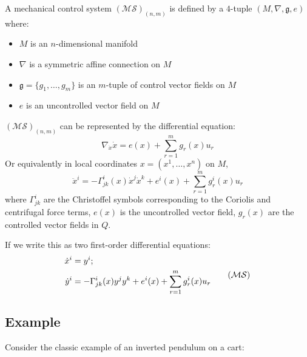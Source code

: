 \begin{defn}
    A mechanical control system $(\mathcal{MS})_{(n,m)}$ is defined by a $4$-tuple $(M, \nabla, \mathfrak{g}, e)$ where:
    \begin{itemize}
        \item $M$ is an $n$-dimensional manifold
        \item $\nabla$ is a symmetric affine connection on $M$
        \item $\mathfrak{g} = \{g_1, \dots, g_m\}$ is an $m$-tuple of control vector fields on $M$
        \item $e$ is an uncontrolled vector field on $M$
    \end{itemize}
    $(\mathcal{MS})_{(n,m)}$ can be represented by the differential equation:
    \begin{equation}
        \nabla_{\dot{x}} \dot{x} = e(x) + \sum_{r=1}^m g_r(x) u_r 
    \end{equation}
    Or equivalently in local coordinates $x = (x^1, \dots, x^n)$ on $M$, 
    \begin{equation}\label{SODE-initial}
        \ddot{x}^i = - \Gamma ^i_{jk}(x)\dot{x}^j \dot{x}^k + e^i(x) + \sum_{r=1}^m g^i_r(x)u_r
    \end{equation}
    where $\Gamma^i_{jk}$ are the Christoffel symbols corresponding to the Coriolis and centrifugal force terms, $e(x)$ is the uncontrolled vector field, $g_r(x)$ are the controlled vector fields in $Q$.

    If we write this as two first-order differential equations:
    \begin{equation}\label{SODE-nonlinear}
        \begin{split}
            \dot{x}^i  &= y^i; \\
            \dot{y}^i  &= - \Gamma^i_{jk}(x)y^jy^k + e^i(x) + \sum_{r=1}^m g_r^i(x)u_r
        \end{split} \tag{$\mathcal{MS}$} 
    \end{equation}
\end{defn}

\newpage

\subsection{Example}

Consider the classic example of an inverted pendulum on a cart:


